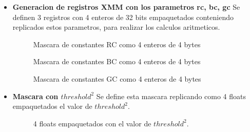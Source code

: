 \begin{itemize}
\begin{itemize}
        \item \textbf{Generacion de registros XMM con los parametros rc, bc, gc}
        Se definen 3 registros con 4 enteros de 32 bits empaquetados conteniendo replicados estos parametros, para realizar los calculos aritmeticos.\\
        \par      
        \bigskip
         \begin{figure}[!ht]
          \centering
          \caption{Mascara de constantes RC como 4 enteros de 4 bytes}
        \end{figure}  

        \par      
        \bigskip
         \begin{figure}[!ht]
          \centering
          \caption{Mascara de constantes BC como 4 enteros de 4 bytes}
        \end{figure}  

        \par      
        \bigskip
         \begin{figure}[!ht]
          \centering
          \caption{Mascara de constantes GC como 4 enteros de 4 bytes}
        \end{figure}  

        \item \textbf{Mascara con $threshold^2$}
        Se define esta mascara replicando como 4 floats empaquetados el valor de $threshold^2$.
                \par      
        \bigskip
         \begin{figure}[!ht]
          \centering
          \caption{4 floats empaquetados con el valor de $threshold^2$.}
        \end{figure}  


\end{itemize}
\end{itemize}
